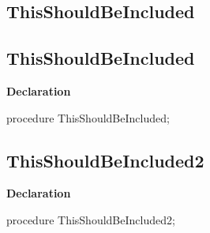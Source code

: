 \documentclass{report}
\newif\ifpdf
\begin{document}
\subsection*{\large{\textbf{ThisShouldBeIncluded}}\normalsize\hspace{1ex}\hrulefill}
\else
\subsection*{ThisShouldBeIncluded}
\fi
\label{ok_macros-ThisShouldBeIncluded}
\begin{list}{}{
\setlength{\itemindent}{0cm}
\setlength{\listparindent}{0cm}
\setlength{\leftmargin}{\evensidemargin}
\addtolength{\leftmargin}{\tmplength}
\settowidth{\labelsep}{X}
\addtolength{\leftmargin}{\labelsep}
\setlength{\labelwidth}{\tmplength}
}
\item[\textbf{Declaration}\hfill]
\ifpdf
\begin{flushleft}
\fi
\begin{ttfamily}
procedure ThisShouldBeIncluded;\end{ttfamily}

\ifpdf
\end{flushleft}
\fi

\end{list}
\ifpdf
\subsection*{\large{\textbf{ThisShouldBeIncluded2}}\normalsize\hspace{1ex}\hrulefill}
\else
\subsection*{ThisShouldBeIncluded2}
\fi
\label{ok_macros-ThisShouldBeIncluded2}
\begin{list}{}{
\setlength{\itemindent}{0cm}
\setlength{\listparindent}{0cm}
\setlength{\leftmargin}{\evensidemargin}
\addtolength{\leftmargin}{\tmplength}
\settowidth{\labelsep}{X}
\addtolength{\leftmargin}{\labelsep}
\setlength{\labelwidth}{\tmplength}
}
\item[\textbf{Declaration}\hfill]
\ifpdf
\begin{flushleft}
\fi
\begin{ttfamily}
procedure ThisShouldBeIncluded2;\end{ttfamily}

\ifpdf
\end{flushleft}
\fi

\end{list}
\end{document}
